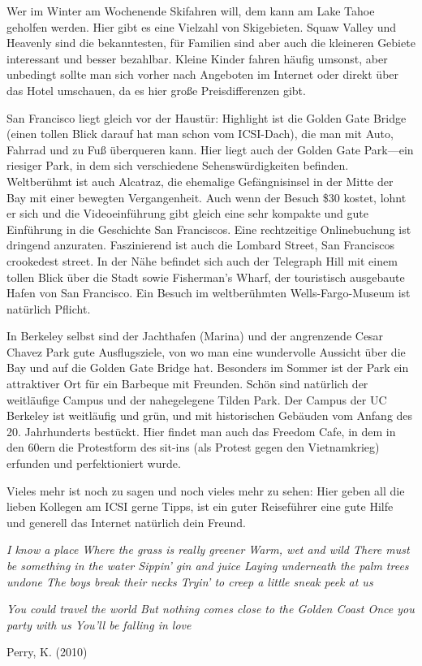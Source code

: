 \documentclass[a4paper]{scrreprt}
\begin{document}
Wer im Winter am Wochenende Skifahren will, dem kann am Lake Tahoe geholfen werden. Hier gibt es eine Vielzahl von Skigebieten. Squaw Valley und Heavenly sind die bekanntesten, für Familien sind aber auch die kleineren Gebiete interessant und besser bezahlbar. Kleine Kinder fahren häufig umsonst, aber unbedingt sollte man sich vorher nach Angeboten im Internet oder direkt über das Hotel umschauen, da es hier große Preisdifferenzen gibt.

San Francisco liegt gleich vor der Haustür: Highlight ist die Golden Gate Bridge (einen tollen Blick darauf hat man schon vom ICSI-Dach), die man mit Auto, Fahrrad und zu Fuß überqueren kann. Hier liegt auch der Golden Gate Park---ein riesiger Park, in dem sich verschiedene Sehenswürdigkeiten befinden. Weltberühmt ist auch Alcatraz, die ehemalige Gefängnisinsel in der Mitte der Bay mit einer bewegten Vergangenheit. Auch wenn der Besuch \$30 kostet, lohnt er sich und die Videoeinführung gibt gleich eine sehr kompakte und gute Einführung in die Geschichte San Franciscos. Eine rechtzeitige Onlinebuchung ist dringend anzuraten. Faszinierend ist auch die Lombard Street, San Franciscos crookedest street. In der Nähe befindet sich auch der Telegraph Hill mit einem tollen Blick über die Stadt sowie Fisherman's Wharf, der touristisch ausgebaute Hafen von San Francisco. Ein Besuch im weltberühmten Wells-Fargo-Museum ist natürlich Pflicht.

In Berkeley selbst sind der Jachthafen (Marina) und der angrenzende Cesar Chavez Park gute Ausflugsziele, von wo man eine wundervolle Aussicht über die Bay und auf die Golden Gate Bridge hat. Besonders im Sommer ist der Park ein attraktiver Ort für ein Barbeque mit Freunden. Schön sind natürlich der weitläufige Campus und der nahegelegene Tilden Park. Der Campus der UC Berkeley ist weitläufig und grün, und mit historischen Gebäuden vom Anfang des 20. Jahrhunderts bestückt. Hier findet man auch das Freedom Cafe, in dem in den 60ern die Protestform des sit-ins (als Protest gegen den Vietnamkrieg) erfunden und perfektioniert wurde.

Vieles mehr ist noch zu sagen und noch vieles mehr zu sehen: Hier geben all die lieben Kollegen am ICSI gerne Tipps, ist ein guter Reiseführer eine gute Hilfe und generell das Internet natürlich dein Freund.

\clearpage

 

\begin{center}
\textit{I know a place
Where the grass is really greener
Warm, wet and wild
There must be something in the water
Sippin' gin and juice
Laying underneath the palm trees undone
The boys break their necks
Tryin' to creep a little sneak peek at us}

\textit{You could travel the world
But nothing comes close to the Golden Coast
Once you party with us
You'll be falling in love}

Perry, K. (2010)
\end{center}
\end{document}
